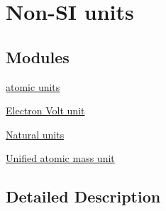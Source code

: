 \hypertarget{group___non-_s_i}{}\section{Non-\/\+SI units}
\label{group___non-_s_i}
\subsection*{Modules}
\begin{DoxyCompactItemize}
\item 
\hyperlink{group___atomic_unit}{atomic units}
\item 
\hyperlink{group___electron_volt_unit}{Electron Volt unit}
\item 
\hyperlink{group___natural_unit}{Natural units}
\item 
\hyperlink{group___unified_atomic_mass_unit}{Unified atomic mass unit}
\end{DoxyCompactItemize}


\subsection{Detailed Description}
